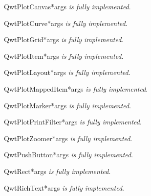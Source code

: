 \documentclass{manual}
\begin{document}
\begin{classdesc}{QwtPlotCanvas}{*args}
\emph{is fully implemented}.
\end{classdesc}

\begin{classdesc}{QwtPlotCurve}{*args}
\emph{is fully implemented}.
\end{classdesc}

\begin{classdesc}{QwtPlotGrid}{*args}
\emph{is fully implemented}.
\end{classdesc}

\begin{classdesc}{QwtPlotItem}{*args}
\emph{is fully implemented}.
\end{classdesc}

\begin{classdesc}{QwtPlotLayout}{*args}
\emph{is fully implemented}.
\end{classdesc}

\begin{classdesc}{QwtPlotMappedItem}{*args}
\emph{is fully implemented}.
\end{classdesc}

\begin{classdesc}{QwtPlotMarker}{*args}
\emph{is fully implemented}.
\end{classdesc}

\begin{classdesc}{QwtPlotPrintFilter}{*args}
\emph{is fully implemented}.
\end{classdesc}

\begin{classdesc}{QwtPlotZoomer}{*args}
\emph{is fully implemented}.
\end{classdesc}

\begin{classdesc}{QwtPushButton}{*args}
\emph{is fully implemented}.
\end{classdesc}

\begin{classdesc}{QwtRect}{*args}
\emph{is fully implemented}.
\end{classdesc}

\begin{classdesc}{QwtRichText}{*args}
\emph{is fully implemented}.
\end{classdesc}
\end{document}
